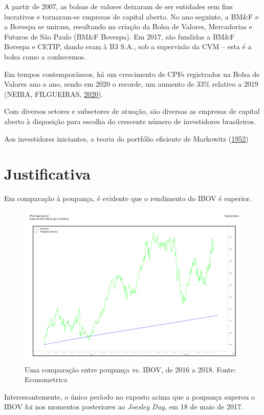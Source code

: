 \documentclass[grad,numbers]{coppe}
\begin{document}
  A partir de 2007, as bolsas de valores deixaram de ser entidades sem fins lucrativos e tornaram-se empresas de capital aberto. No ano seguinte, a BM\&F e a Bovespa se uniram, resultando na criação da Bolsa de Valores, Mercadorias e Futuros de São Paulo (BM\&F Bovespa). Em 2017, são fundidas a BM\&F Bovespa e CETIP, dando eram à B3 S.A., sob a supervisão da CVM -- esta é a bolsa como a conhecemos.
  
  Em tempos contemporâneos, há um crescimento de CPFs registrados na Bolsa de Valores ano a ano, sendo em 2020 o recorde, um aumento de 33\% relativo a 2019 (NEIRA, FILGUEIRAS, \protect\hyperlink{ref-valorinveste2020}{2020}).
  
  Com diversos setores e subsetores de atuação, são diversas as empresas de capital aberto à disposição para escolha do crescente número de investidores brasileiros.
  
  Aos investidores iniciantes, a teoria do portfólio eficiente de Markowitz (\protect\hyperlink{ref-markowitz1952}{1952})
  
  \hypertarget{justificativa}{%
  \section{Justificativa}\label{justificativa}}
  
  Em comparação à poupança, é evidente que o rendimento do IBOV é superior.
  \begin{figure}
  \includegraphics[width=1\linewidth]{figure/poupanca-ou-acoes-grafico} \caption{Uma comparação entre poupança vs. IBOV, de 2016 a 2018. Fonte: Econometrica}\label{fig:ibovpoupanca}
  \end{figure}
  Interessantemente, o único período no exposto acima que a poupança superou o IBOV foi nos momentos posteriores ao \emph{Joesley Day}, em 18 de maio de 2017.
  
\end{document}
